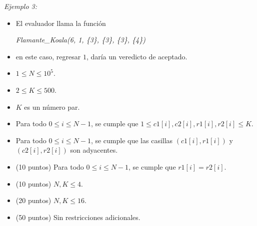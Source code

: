 \documentclass[12pt]{scrartcl}
\begin{document}
        {\itshape Ejemplo 3:}
        \begin{itemize}
            \item El evaluador llama la función 

            \begin{center}
                {\itshape Flamante\_Koala(6, 1, \{3\}, \{3\}, \{3\}, \{4\})}
            \end{center}
            
            \item en este caso, regresar $1$, daría un veredicto de aceptado. 
        \end{itemize}
        
        \begin{itemize}
            \item $1 \le N \le 10^5$.
            \item $2 \le K \le 500$. 
            \item $K$ es un número par.
            \item Para todo $0 \le i \le N - 1$, se cumple que $1 \le c1[i], c2[i], r1[i], r2[i] \le K$.
            \item Para todo $0 \le i \le N - 1$, se cumple que las casillas $(c1[i], r1[i])$ y $(c2[i], r2[i])$ son adyacentes.
        \end{itemize}
    


    \begin{itemize}
        \item (10 puntos) Para todo $0 \le i \le N - 1$, se cumple que $r1[i] = r2[i]$.
        \item (10 puntos) $N, K \le 4$.
        \item (20 puntos) $N, K \le 16$.
        \item (50 puntos) Sin restricciones adicionales.
    \end{itemize}
\end{document}
